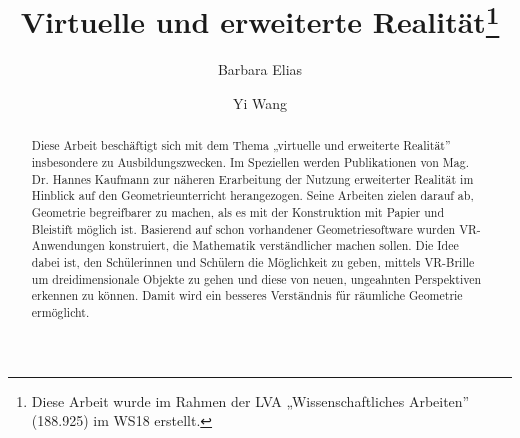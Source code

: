 \documentclass[deutsch]{llncs}
\begin{document}
\def\abstractname{Kurzfassung.}

\pagestyle{plain}

\title{Virtuelle und erweiterte Realität\thanks{Diese Arbeit wurde im Rahmen der LVA „Wissenschaftliches Arbeiten'' (188.925) im WS18 erstellt.}}




\author{Barbara Elias \and Yi Wang}


\maketitle

\setcounter{footnote}{0}

\begin{abstract}
Diese Arbeit beschäftigt sich mit dem Thema „virtuelle und erweiterte Realität'' insbesondere zu Ausbildungszwecken. Im Speziellen werden Publikationen von Mag. Dr. Hannes Kaufmann zur näheren Erarbeitung der Nutzung erweiterter Realität im Hinblick auf den Geometrieunterricht herangezogen. Seine Arbeiten zielen darauf ab, Geometrie begreifbarer zu machen, als es mit der Konstruktion mit Papier und Bleistift möglich ist. Basierend auf schon vorhandener Geometriesoftware wurden VR-Anwendungen konstruiert, die Mathematik verständlicher machen sollen. Die Idee dabei ist, den Schülerinnen und Schülern die Möglichkeit zu geben, mittels VR-Brille um dreidimensionale Objekte zu gehen und diese von neuen, ungeahnten Perspektiven erkennen zu können. Damit wird ein besseres Verständnis für räumliche Geometrie ermöglicht.
\end{abstract}
\end{document}
